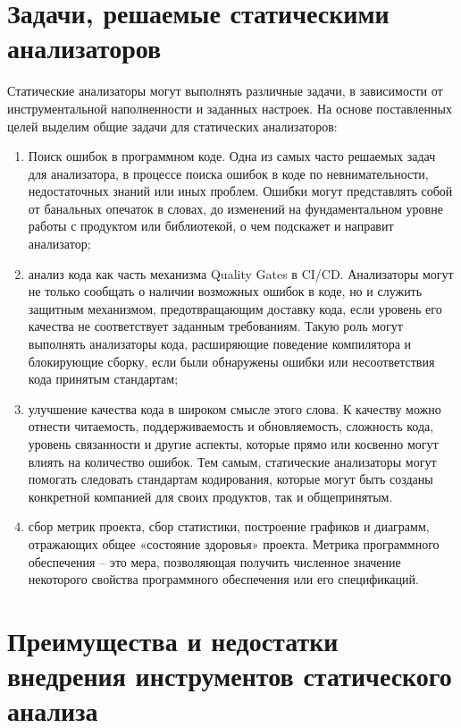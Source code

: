 \section{Задачи, решаемые статическими анализаторов}

Статические анализаторы могут выполнять различные задачи, в зависимости от инструментальной наполненности и заданных настроек. На основе поставленных целей выделим общие задачи для статических анализаторов:

\begin{enumerate}

    \item Поиск ошибок в программном коде. Одна из самых часто решаемых задач для анализатора, в процессе поиска ошибок в коде по невнимательности, недостаточных знаний или иных проблем. Ошибки могут представлять собой от банальных опечаток в словах, до изменений на фундаментальном уровне работы с продуктом или библиотекой, о чем подскажет и направит анализатор;
    
    \item анализ кода как часть механизма Quality Gates в CI/CD. Анализаторы могут не только сообщать о наличии возможных ошибок в коде, но и служить защитным механизмом, предотвращающим доставку кода, если уровень его качества не соответствует заданным требованиям. Такую роль могут выполнять анализаторы кода, расширяющие поведение компилятора и блокирующие сборку, если были обнаружены ошибки или несоответствия кода принятым стандартам;
      
    \item улучшение качества кода в широком смысле этого слова. К качеству можно отнести читаемость, поддерживаемость и обновляемость, сложность кода, уровень связанности и другие аспекты, которые прямо или косвенно могут влиять на количество ошибок. Тем самым, статические анализаторы могут помогать следовать стандартам кодирования, которые могут быть созданы конкретной компанией для своих продуктов, так и общепринятым.
        
    \item сбор метрик проекта, сбор статистики, построение графиков и диаграмм, отражающих общее «состояние здоровья» проекта.  Метрика программного обеспечения -- это мера, позволяющая получить численное значение некоторого свойства программного обеспечения или его спецификаций.
          
\end{enumerate}

\section{Преимущества и недостатки внедрения инструментов статического анализа}

